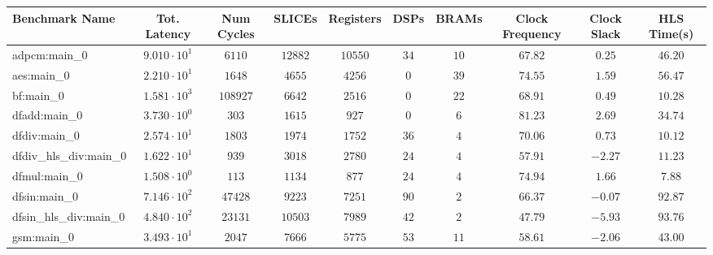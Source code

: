 \begin{tabular}{|l|c|c|c|c|c|c|c|c|c|}
\hline
Benchmark Name          & Tot. Latency           & Num Cycles & SLICEs    & Registers & DSPs    & BRAMs   & Clock Frequency & Clock Slack & HLS Time(s) \\
\hline
adpcm:main\_0           & $ 9.010 \cdot 10^{1} $ & $ 6110   $ & $ 12882 $ & $ 10550 $ & $ 34  $ & $ 10  $ & $ 67.82       $ & $ 0.25    $ & $ 46.20   $ \\
aes:main\_0             & $ 2.210 \cdot 10^{1} $ & $ 1648   $ & $ 4655  $ & $ 4256  $ & $ 0   $ & $ 39  $ & $ 74.55       $ & $ 1.59    $ & $ 56.47   $ \\
bf:main\_0              & $ 1.581 \cdot 10^{3} $ & $ 108927 $ & $ 6642  $ & $ 2516  $ & $ 0   $ & $ 22  $ & $ 68.91       $ & $ 0.49    $ & $ 10.28   $ \\
dfadd:main\_0           & $ 3.730 \cdot 10^{0} $ & $ 303    $ & $ 1615  $ & $ 927   $ & $ 0   $ & $ 6   $ & $ 81.23       $ & $ 2.69    $ & $ 34.74   $ \\
dfdiv:main\_0           & $ 2.574 \cdot 10^{1} $ & $ 1803   $ & $ 1974  $ & $ 1752  $ & $ 36  $ & $ 4   $ & $ 70.06       $ & $ 0.73    $ & $ 10.12   $ \\
dfdiv\_hls\_div:main\_0 & $ 1.622 \cdot 10^{1} $ & $ 939    $ & $ 3018  $ & $ 2780  $ & $ 24  $ & $ 4   $ & $ 57.91       $ & $ -2.27   $ & $ 11.23   $ \\
dfmul:main\_0           & $ 1.508 \cdot 10^{0} $ & $ 113    $ & $ 1134  $ & $ 877   $ & $ 24  $ & $ 4   $ & $ 74.94       $ & $ 1.66    $ & $ 7.88    $ \\
dfsin:main\_0           & $ 7.146 \cdot 10^{2} $ & $ 47428  $ & $ 9223  $ & $ 7251  $ & $ 90  $ & $ 2   $ & $ 66.37       $ & $ -0.07   $ & $ 92.87   $ \\
dfsin\_hls\_div:main\_0 & $ 4.840 \cdot 10^{2} $ & $ 23131  $ & $ 10503 $ & $ 7989  $ & $ 42  $ & $ 2   $ & $ 47.79       $ & $ -5.93   $ & $ 93.76   $ \\
gsm:main\_0             & $ 3.493 \cdot 10^{1} $ & $ 2047   $ & $ 7666  $ & $ 5775  $ & $ 53  $ & $ 11  $ & $ 58.61       $ & $ -2.06   $ & $ 43.00   $ \\

\end{tabular}
